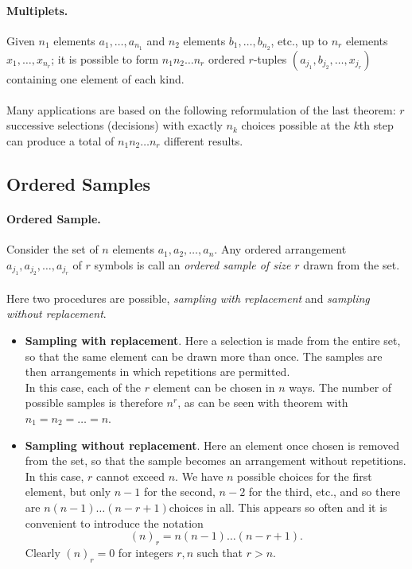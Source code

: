 \documentclass{article}
\numberwithin{equation}{subsection}
\begin{document}
			\paragraph{Multiplets.} Given $n_1$ elements $a_1,\dots,a_{n_1}$ and $n_2$ elements $b_1,\dots,b_{n_2}$, etc., up to $n_r$ elements $x_1,\dots,x_{n_r}$; it is possible to form $n_1n_2\dots n_r$ ordered $r$-tuples $(a_{j_1}, b_{j_2}, \dots, x_{j_r})$ containing one element of each kind.
			\paragraph{} Many applications are based on the following reformulation of the last theorem: $r$ successive selections (decisions) with exactly $n_k$ choices possible at the $k$th step can produce a total of $n_1n_2\dots n_r$ different results.
		\subsection{Ordered Samples}
			\paragraph{Ordered Sample. } Consider the set of $n$ elements $a_1, a_2,\dots, a_n$. Any ordered arrangement $a_{j_1}, a_{j_2}, \dots, a_{j_r}$ of $r$ symbols is call an \textit{ordered sample of size $r$} drawn from the set.
			\paragraph{} Here two procedures are possible, \textit{sampling with replacement} and \textit{sampling without replacement}.
			\begin{itemize}
			\item \textbf{Sampling with replacement}. Here a selection is made from the entire set, so that the same element can be drawn more than once. The samples are then arrangements in which repetitions are permitted. \\ In this case, each of the $r$ element can be chosen in $n$ ways. The number of possible samples is therefore $n^r$, as can be seen with theorem with $n_1 = n_2 = \dots = n$.
			\item \textbf{Sampling without replacement}. Here an element once chosen is removed from the set, so that the sample becomes an arrangement without repetitions. \\ In this case, $r$ cannot exceed $n$. We have $n$ possible choices for the first element, but only $n-1$ for the second, $n-2$ for the third, etc., and so there are $n(n-1)\dots (n-r+1)$choices in all. This appears so often and it is convenient to introduce the notation 
			\begin{equation}
				(n)_r = n(n-1)\dots (n-r+1).
			\end{equation}
			Clearly $(n)_r = 0$ for integers $r, n$ such that $r > n$.
			\end{itemize}			
\end{document}
